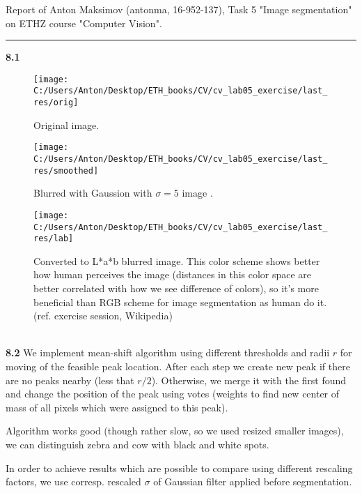 \documentclass{report}
\begin{document}
\large
{}
Report of Anton Maksimov (antonma, 16-952-137), Task 5 "Image segmentation" on ETHZ course "Computer Vision".\\
\rule{\linewidth}{1pt}
	\textbf{8.1}
	\begin{figure}[h!]
		\begin{center}
			\begin{minipage}[h]{0.49\linewidth}
				\texttt{[image: C:/Users/Anton/Desktop/ETH\_books/CV/cv\_lab05\_exercise/last\_res/orig]}
				\caption{Original image.}
			\end{minipage}
			\hfill
			\begin{minipage}[h]{0.49\linewidth}
				\texttt{[image: C:/Users/Anton/Desktop/ETH\_books/CV/cv\_lab05\_exercise/last\_res/smoothed]}
				\caption{Blurred with Gaussion with $\sigma = 5$ image .}
			\end{minipage}
		\hfill
			\begin{minipage}[h]{0.49\linewidth}
				\texttt{[image: C:/Users/Anton/Desktop/ETH\_books/CV/cv\_lab05\_exercise/last\_res/lab]}
				\caption{Converted to L*a*b blurred image. This color scheme shows better how human perceives the image (distances in this color space are better correlated with how we see difference of colors), so it's more beneficial than RGB scheme for image segmentation as human do it. (ref. exercise session, Wikipedia)}
			\end{minipage}
		\end{center}
	\end{figure}\\

\textbf{8.2}
We implement mean-shift algorithm using different thresholds and radii $r$ for moving of the feasible peak location. After each step we create new peak if there are no peaks nearby (less that $r/2$). Otherwise, we merge it with the first found and change the position of the peak using votes (weights to find new center of mass of all pixels which were assigned to this peak).

Algorithm works good (though rather slow, so we used resized smaller images), we can distinguish zebra and cow with black and white spots.

In order to achieve results which are possible to compare using different rescaling factors, we use corresp. rescaled $\sigma$ of Gaussian filter applied before segmentation.
\end{document}
